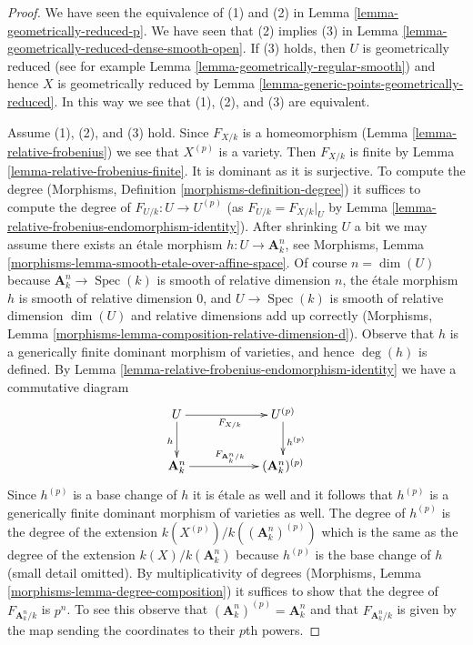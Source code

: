 \documentclass[10pt,a4paper]{amsart}
\theoremstyle{plain}
\theoremstyle{definition}
\theoremstyle{remark}
\numberwithin{equation}{subsection}
\def\Spec{\mathop{\mathrm{Spec}}}
\begin{document}
\begin{proof}
We have seen the equivalence of (1) and (2) in
Lemma \ref{lemma-geometrically-reduced-p}.
We have seen that (2) implies (3) in
Lemma \ref{lemma-geometrically-reduced-dense-smooth-open}.
If (3) holds, then $U$ is geometrically reduced
(see for example Lemma \ref{lemma-geometrically-regular-smooth})
and hence $X$ is geometrically reduced by
Lemma \ref{lemma-generic-points-geometrically-reduced}.
In this way we see that (1), (2), and (3) are equivalent.

\medskip\noindent
Assume (1), (2), and (3) hold. Since $F_{X/k}$ is a homeomorphism
(Lemma \ref{lemma-relative-frobenius}) we see that $X^{(p)}$ is a variety.
Then $F_{X/k}$ is finite by Lemma \ref{lemma-relative-frobenius-finite}.
It is dominant as it is surjective. To compute the degree
(Morphisms, Definition \ref{morphisms-definition-degree})
it suffices to compute the degree of $F_{U/k} : U \to U^{(p)}$
(as $F_{U/k} = F_{X/k}|_U$ by
Lemma \ref{lemma-relative-frobenius-endomorphism-identity}).
After shrinking $U$ a bit we may assume there exists an
\'etale morphism $h : U \to \mathbf{A}^n_k$, see
Morphisms, Lemma \ref{morphisms-lemma-smooth-etale-over-affine-space}.
Of course $n = \dim(U)$ because
$\mathbf{A}^n_k \to \Spec(k)$ is smooth of relative dimension $n$,
the \'etale morphism $h$ is smooth of relative dimension $0$, and
$U \to \Spec(k)$ is smooth of relative dimension $\dim(U)$
and relative dimensions add up correctly
(Morphisms, Lemma \ref{morphisms-lemma-composition-relative-dimension-d}).
Observe that $h$ is a generically finite dominant morphism
of varieties, and hence $\deg(h)$ is defined.
By Lemma \ref{lemma-relative-frobenius-endomorphism-identity}
we have a commutative diagram
$$
\xymatrix{
U \ar[rr]_{F_{X/k}} \ar[d]_h & & U^{(p)} \ar[d]^{h^{(p)}} \\
\mathbf{A}^n_k \ar[rr]^{F_{\mathbf{A}^n_k/k}} & &
(\mathbf{A}^n_k)^{(p)}
}
$$
Since $h^{(p)}$ is a base change of $h$ it is \'etale as well
and it follows that $h^{(p)}$ is a generically finite dominant
morphism of varieties as well. The degree of $h^{(p)}$ is the
degree of the extension $k(X^{(p)})/k((\mathbf{A}^n_k)^{(p)})$
which is the same as the degree of the extension $k(X)/k(\mathbf{A}^n_k)$
because $h^{(p)}$ is the base change of $h$ (small detail omitted).
By multiplicativity of degrees
(Morphisms, Lemma \ref{morphisms-lemma-degree-composition})
it suffices to show that the degree of $F_{\mathbf{A}^n_k/k}$
is $p^n$. To see this observe that
$(\mathbf{A}^n_k)^{(p)} = \mathbf{A}^n_k$ and that
$F_{\mathbf{A}^n_k/k}$ is given by the map sending the
coordinates to their $p$th powers.
\end{proof}
\end{document}
